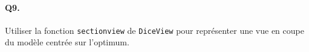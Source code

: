 \documentclass[12pt]{scrartcl}
\begin{document}
\paragraph{Q9. } Utiliser la fonction \texttt{sectionview} de \texttt{DiceView} pour représenter une vue en coupe du modèle centrée sur l'optimum.

\end{document}
